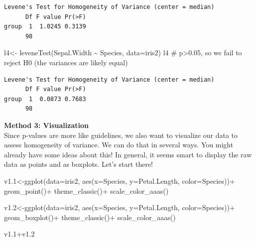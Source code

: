 \documentclass[
  letterpaper,
  DIV=11,
  numbers=noendperiod]{scrartcl}
\newenvironment{Shaded}{\begin{snugshade}}{\end{snugshade}}
\newcommand{\AttributeTok}[1]{\textcolor[rgb]{0.40,0.45,0.13}{#1}}
\newcommand{\CommentTok}[1]{\textcolor[rgb]{0.37,0.37,0.37}{#1}}
\newcommand{\FloatTok}[1]{\textcolor[rgb]{0.68,0.00,0.00}{#1}}
\newcommand{\FunctionTok}[1]{\textcolor[rgb]{0.28,0.35,0.67}{#1}}
\newcommand{\NormalTok}[1]{\textcolor[rgb]{0.00,0.23,0.31}{#1}}
\newcommand{\OtherTok}[1]{\textcolor[rgb]{0.00,0.23,0.31}{#1}}
\newcommand{\SpecialCharTok}[1]{\textcolor[rgb]{0.37,0.37,0.37}{#1}}
\begin{document}
\begin{verbatim}
Levene's Test for Homogeneity of Variance (center = median)
      Df F value Pr(>F)
group  1  1.0245 0.3139
      98               
\end{verbatim}

\begin{Shaded}
\begin{Highlighting}[]
\NormalTok{l4}\OtherTok{\textless{}{-}} \FunctionTok{leveneTest}\NormalTok{(Sepal.Width }\SpecialCharTok{\textasciitilde{}}\NormalTok{ Species, }\AttributeTok{data=}\NormalTok{iris2)}
\NormalTok{l4 }\CommentTok{\# p\textgreater{}0.05, so we fail to reject H0 (the variances are likely equal)}
\end{Highlighting}
\end{Shaded}

\begin{verbatim}
Levene's Test for Homogeneity of Variance (center = median)
      Df F value Pr(>F)
group  1  0.0873 0.7683
      98               
\end{verbatim}

\hfill\break
\textbf{Method 3: Visualization}\\
Since p-values are more like guidelines, we also want to visualize our
data to assess homogeneity of variance. We can do that in several ways.
You might already have some ideas about this! In general, it seems smart
to display the raw data as points and as boxplots. Let's start there!

\begin{Shaded}
\begin{Highlighting}[]
\NormalTok{v1}\FloatTok{.1}\OtherTok{\textless{}{-}}\FunctionTok{ggplot}\NormalTok{(}\AttributeTok{data=}\NormalTok{iris2, }\FunctionTok{aes}\NormalTok{(}\AttributeTok{x=}\NormalTok{Species, }\AttributeTok{y=}\NormalTok{Petal.Length, }\AttributeTok{color=}\NormalTok{Species))}\SpecialCharTok{+}
  \FunctionTok{geom\_point}\NormalTok{()}\SpecialCharTok{+}
  \FunctionTok{theme\_classic}\NormalTok{()}\SpecialCharTok{+}
  \FunctionTok{scale\_color\_aaas}\NormalTok{()}

\NormalTok{v1}\FloatTok{.2}\OtherTok{\textless{}{-}}\FunctionTok{ggplot}\NormalTok{(}\AttributeTok{data=}\NormalTok{iris2, }\FunctionTok{aes}\NormalTok{(}\AttributeTok{x=}\NormalTok{Species, }\AttributeTok{y=}\NormalTok{Petal.Length, }\AttributeTok{color=}\NormalTok{Species))}\SpecialCharTok{+}
  \FunctionTok{geom\_boxplot}\NormalTok{()}\SpecialCharTok{+}
  \FunctionTok{theme\_classic}\NormalTok{()}\SpecialCharTok{+}
  \FunctionTok{scale\_color\_aaas}\NormalTok{()}

\NormalTok{v1}\FloatTok{.1}\SpecialCharTok{+}\NormalTok{v1}\FloatTok{.2}
\end{Highlighting}
\end{Shaded}
\end{document}
